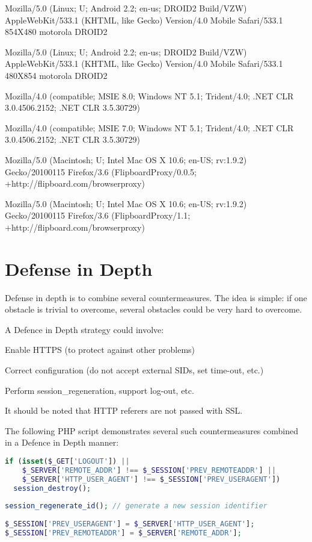 \begin{compactitem}
\item Mozilla/5.0 (Linux; U; Android 2.2; en-us; DROID2 Build/VZW) AppleWebKit/533.1 (KHTML, like Gecko) Version/4.0 Mobile Safari/533.1 854X480 motorola DROID2
\item Mozilla/5.0 (Linux; U; Android 2.2; en-us; DROID2 Build/VZW) AppleWebKit/533.1 (KHTML, like Gecko) Version/4.0 Mobile Safari/533.1 480X854 motorola DROID2
\item Mozilla/4.0 (compatible; MSIE 8.0; Windows NT 5.1; Trident/4.0; .NET CLR 3.0.4506.2152; .NET CLR 3.5.30729)
\item Mozilla/4.0 (compatible; MSIE 7.0; Windows NT 5.1; Trident/4.0; .NET CLR 3.0.4506.2152; .NET CLR 3.5.30729)
\item Mozilla/5.0 (Macintosh; U; Intel Mac OS X 10.6; en-US; rv:1.9.2) Gecko/20100115 Firefox/3.6 (FlipboardProxy/0.0.5; +http://flipboard.com/browserproxy)
\item Mozilla/5.0 (Macintosh; U; Intel Mac OS X 10.6; en-US; rv:1.9.2) Gecko/20100115 Firefox/3.6 (FlipboardProxy/1.1; +http://flipboard.com/browserproxy)
\end{compactitem}




\section{Defense in Depth}



Defense in depth is to combine several countermeasures. The idea is simple: if one obstacle is trivial to overcome, several obstacles could be very hard to overcome.

A Defence in Depth strategy could involve:

\begin{compactitem}
\item Enable HTTPS (to protect against other problems)
\item Correct configuration (do not accept external SIDs, set time-out, etc.)
\item Perform session\_regeneration, support log-out, etc.
\end{compactitem}

It should be noted that HTTP referers are not passed with SSL.

The following PHP script demonstrates several such countermeasures combined in a Defence in Depth manner:

\begin{lstlisting}[language=PHP]
if (isset($_GET['LOGOUT']) ||
    $_SERVER['REMOTE_ADDR'] !== $_SESSION['PREV_REMOTEADDR'] ||
    $_SERVER['HTTP_USER_AGENT'] !== $_SESSION['PREV_USERAGENT'])
  session_destroy();
 
session_regenerate_id(); // generate a new session identifier
 
$_SESSION['PREV_USERAGENT'] = $_SERVER['HTTP_USER_AGENT'];
$_SESSION['PREV_REMOTEADDR'] = $_SERVER['REMOTE_ADDR'];
\end{lstlisting}

